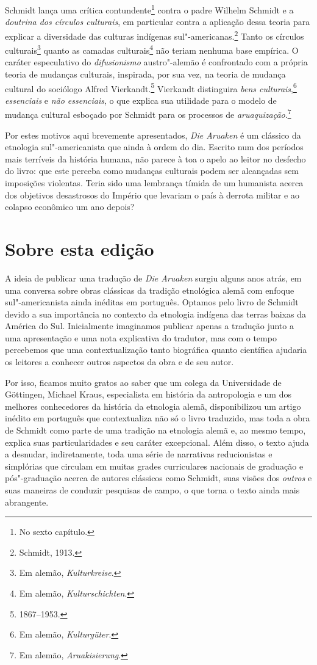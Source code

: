 Schmidt lança uma crítica contundente\footnote{No sexto capítulo.} contra o padre Wilhelm
Schmidt e a \textit{doutrina dos círculos culturais}, em particular contra a
aplicação dessa teoria para explicar a diversidade das culturas
indígenas sul"-americanas.\footnote{Schmidt, 1913.} Tanto os círculos culturais\footnote{Em alemão, \textit{Kulturkreise}.} quanto as camadas culturais\footnote{Em alemão, \textit{Kulturschichten}.} não teriam nenhuma base empírica. O caráter
especulativo do \textit{difusionismo} austro"-alemão é confrontado com a própria
teoria de mudanças culturais, inspirada, por sua vez, na teoria de
mudança cultural do sociólogo Alfred Vierkandt.\footnote{1867--1953.} Vierkandt distinguira \textit{bens culturais},\footnote{Em alemão, \textit{Kulturgüter}.} \textit{essenciais} e \textit{não essenciais}, o que explica
sua utilidade para o modelo de mudança cultural esboçado por Schmidt
para os processos de \textit{aruaquização}.\footnote{Em alemão, \textit{Aruakisierung}.}

Por estes motivos aqui brevemente apresentados, \textit{Die Aruaken} é um clássico da 
etnologia sul"-americanista que ainda à ordem do dia. Escrito num dos períodos mais terríveis da história
humana, não parece à toa o apelo ao leitor no desfecho do livro: que este perceba como 
mudanças culturais podem ser alcançadas sem
imposições violentas. Teria sido uma lembrança tímida de um humanista
acerca dos objetivos desastrosos do Império que levariam o país à derrota
militar e ao colapso econômico um ano depois?

\section{Sobre esta edição}

A ideia de publicar uma tradução de \textit{Die Aruaken} surgiu alguns
anos atrás, em uma conversa sobre obras clássicas da tradição etnológica alemã com enfoque sul"-americanista 
ainda inéditas em português. Optamos pelo livro
de Schmidt devido a sua importância no contexto da etnologia
indígena das terras baixas da América do Sul. Inicialmente imaginamos
publicar apenas a tradução junto a uma apresentação e uma nota
explicativa do tradutor, mas com o tempo percebemos que uma
contextualização tanto biográfica quanto científica ajudaria os leitores
a conhecer outros aspectos da obra e de seu autor.

Por isso, ficamos muito gratos ao saber que um colega da Universidade de Göttingen, Michael Kraus, especialista em história da antropologia e um dos melhores conhecedores da história da etnologia alemã, disponibilizou um artigo inédito em português que contextualiza não só o livro traduzido, mas toda a obra de Schmidt como parte de uma tradição na etnologia alemã e, ao mesmo tempo, explica suas particularidades e seu caráter excepcional. Além disso, o texto ajuda a desnudar, indiretamente, toda uma série de narrativas reducionistas e simplórias que circulam em muitas grades curriculares nacionais de graduação e pós"-graduação acerca de autores clássicos como Schmidt, suas visões dos \textit{outros} e suas maneiras de conduzir pesquisas de campo, o que torna o texto ainda mais abrangente.

